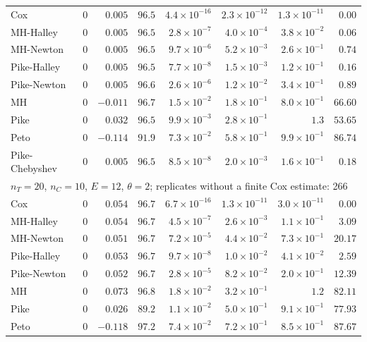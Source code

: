 \begin{landscape}
\begin{longtable}{lrrrrrrr}
Cox & 0 & $0.005$ & $96.5$ & $4.4 \times 10^{-16}$ & $2.3 \times 10^{-12}$ & $1.3 \times 10^{-11}$ & $0.00$ \\
MH-Halley & 0 & $0.005$ & $96.5$ & $2.8 \times 10^{-7}$ & $4.0 \times 10^{-4}$ & $3.8 \times 10^{-2}$ & $0.06$ \\
MH-Newton & 0 & $0.005$ & $96.5$ & $9.7 \times 10^{-6}$ & $5.2 \times 10^{-3}$ & $2.6 \times 10^{-1}$ & $0.74$ \\
Pike-Halley & 0 & $0.005$ & $96.5$ & $7.7 \times 10^{-8}$ & $1.5 \times 10^{-3}$ & $1.2 \times 10^{-1}$ & $0.16$ \\
Pike-Newton & 0 & $0.005$ & $96.6$ & $2.6 \times 10^{-6}$ & $1.2 \times 10^{-2}$ & $3.4 \times 10^{-1}$ & $0.89$ \\
MH & 0 & $-0.011$ & $96.7$ & $1.5 \times 10^{-2}$ & $1.8 \times 10^{-1}$ & $8.0 \times 10^{-1}$ & $66.60$ \\
Pike & 0 & $0.032$ & $96.5$ & $9.9 \times 10^{-3}$ & $2.8 \times 10^{-1}$ & $1.3$ & $53.65$ \\
Peto & 0 & $-0.114$ & $91.9$ & $7.3 \times 10^{-2}$ & $5.8 \times 10^{-1}$ & $9.9 \times 10^{-1}$ & $86.74$ \\
Pike-Chebyshev & 0 & $0.005$ & $96.5$ & $8.5 \times 10^{-8}$ & $2.0 \times 10^{-3}$ & $1.6 \times 10^{-1}$ & $0.18$ \\
\multicolumn{8}{l}{$n_T = 20$, $n_C = 10$, $E = 12$, $\theta = 2$; replicates without a finite Cox estimate: 266} \\
Cox & 0 & $0.054$ & $96.7$ & $6.7 \times 10^{-16}$ & $1.3 \times 10^{-11}$ & $3.0 \times 10^{-11}$ & $0.00$ \\
MH-Halley & 0 & $0.054$ & $96.7$ & $4.5 \times 10^{-7}$ & $2.6 \times 10^{-3}$ & $1.1 \times 10^{-1}$ & $3.09$ \\
MH-Newton & 0 & $0.051$ & $96.7$ & $7.2 \times 10^{-5}$ & $4.4 \times 10^{-2}$ & $7.3 \times 10^{-1}$ & $20.17$ \\
Pike-Halley & 0 & $0.053$ & $96.7$ & $9.7 \times 10^{-8}$ & $1.0 \times 10^{-2}$ & $4.1 \times 10^{-2}$ & $2.59$ \\
Pike-Newton & 0 & $0.052$ & $96.7$ & $2.8 \times 10^{-5}$ & $8.2 \times 10^{-2}$ & $2.0 \times 10^{-1}$ & $12.39$ \\
MH & 0 & $0.073$ & $96.8$ & $1.8 \times 10^{-2}$ & $3.2 \times 10^{-1}$ & $1.2$ & $82.11$ \\
Pike & 0 & $0.026$ & $89.2$ & $1.1 \times 10^{-2}$ & $5.0 \times 10^{-1}$ & $9.1 \times 10^{-1}$ & $77.93$ \\
Peto & 0 & $-0.118$ & $97.2$ & $7.4 \times 10^{-2}$ & $7.2 \times 10^{-1}$ & $8.5 \times 10^{-1}$ & $87.67$ \\

\end{longtable}
\end{landscape}
